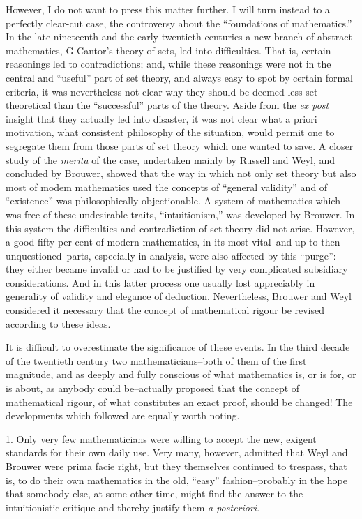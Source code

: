 \documentclass{article}
\begin{document}
However, I do not want to press this matter further. I will turn instead to a perfectly clear-cut case, the controversy about the ``foundations of mathematics.'' In the late nineteenth and the early twentieth centuries a new branch of abstract mathematics, G Cantor's theory of sets, led into difficulties. That is, certain reasonings led to contradictions; and, while these reasonings were not in the central and ``useful'' part of set theory, and always easy to spot by certain formal criteria, it was nevertheless not clear why they should be deemed less set-theoretical than the ``successful'' parts of the theory. Aside from the \textit{ex post} insight that they actually led into disaster, it was not clear what a priori motivation, what consistent philosophy of the situation, would permit one to segregate them from those parts of set theory which one wanted to save. A closer study of the \textit{merita} of the case, undertaken mainly by Russell and Weyl, and concluded by Brouwer, showed that the way in which not only set theory but also most of modem mathematics used the concepts of ``general validity'' and of ``existence'' was philosophically objectionable. A system of mathematics which was free of these undesirable traits, ``intuitionism,'' was developed by Brouwer. In this system the difficulties and contradiction of set theory did not arise. However, a good fifty per cent of modern mathematics, in its most vital--and up to then unquestioned--parts, especially in analysis, were also affected by this ``purge'': they either became invalid or had to be justified by very complicated subsidiary considerations. And in this latter process one usually lost appreciably in generality of validity and elegance of deduction. Nevertheless, Brouwer and Weyl considered it necessary that the concept of mathematical rigour be revised according to these ideas.

It is difficult to overestimate the significance of these events. In the third decade of the twentieth century two mathematicians--both of them of the first magnitude, and as deeply and fully conscious of what mathematics is, or is for, or is about, as anybody could be--actually proposed that the concept of mathematical rigour, of what constitutes an exact proof, should be changed! The developments which followed are equally worth noting.

1. Only very few mathematicians were willing to accept the new, exigent standards for their own daily use. Very many, however, admitted that Weyl and Brouwer were prima facie right, but they themselves continued to trespass, that is, to do their own mathematics in the old, ``easy'' fashion--probably in the hope that somebody else, at some other time, might find the answer to the intuitionistic critique and thereby justify them \textit{a posteriori}.
\end{document}
